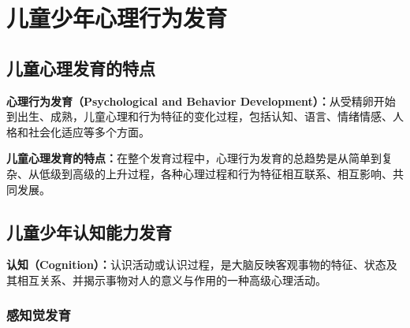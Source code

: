 \chapter{儿童少年心理行为发育}
\setcounter{chapter}{6}

\section{儿童心理发育的特点}

\begin{keybox}
\textbf{心理行为发育（Psychological and Behavior Development）：}从受精卵开始到出生、成熟，儿童心理和行为特征的变化过程，包括认知、语言、情绪情感、人格和社会化适应等多个方面。

\textbf{儿童心理发育的特点：}在整个发育过程中，心理行为发育的总趋势是从简单到复杂、从低级到高级的上升过程，各种心理过程和行为特征相互联系、相互影响、共同发展。
\end{keybox}

\section{儿童少年认知能力发育}

\begin{keybox}
\textbf{认知（Cognition）：}认识活动或认识过程，是大脑反映客观事物的特征、状态及其相互关系、并揭示事物对人的意义与作用的一种高级心理活动。
\end{keybox}

\subsection{感知觉发育}

